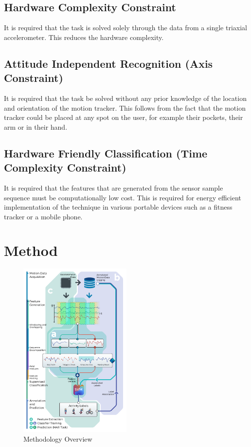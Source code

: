 \documentclass[5p]{elsarticle}
\begin{document}
\subsection{Hardware Complexity Constraint}
It is required that the task is solved solely through the data from a single triaxial accelerometer. This reduces the hardware complexity.

\subsection{Attitude Independent Recognition (Axis Constraint)}
\label{axis_constraint}
It is required that the task be solved without any prior knowledge of the location and orientation of the motion tracker. This follows from the fact that the motion tracker could be placed at any spot on the user, for example their pockets, their arm or in their hand.

\subsection{Hardware Friendly Classification (Time Complexity Constraint)}
\label{time_constraint}
It is required that the features that are generated from the sensor sample sequence must be computationally low cost. This is required for energy efficient implementation of the technique in various portable devices such as a fitness tracker or a mobile phone.

\section{Method}

\begin{figure}[h!]
  \begin{center}
    \includegraphics[width=0.5\textwidth]{HAR_Illustration}
  \end{center}
  \vspace{-10pt}
  \caption{\label{har_illustration}Methodology Overview}
\end{figure}
\end{document}
